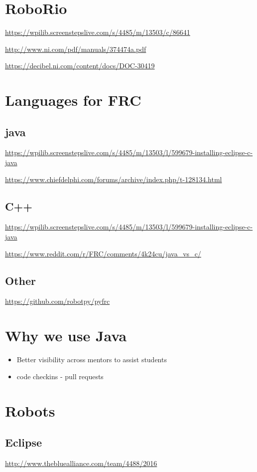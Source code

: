 \documentclass{article}
\begin{document}
\section{RoboRio}
\url{https://wpilib.screenstepslive.com/s/4485/m/13503/c/86641}

\url{http://www.ni.com/pdf/manuals/374474a.pdf}

\url{https://decibel.ni.com/content/docs/DOC-30419}

\section{Languages for FRC}
\subsection{java}
\url{https://wpilib.screenstepslive.com/s/4485/m/13503/l/599679-installing-eclipse-c-java}

\url{https://www.chiefdelphi.com/forums/archive/index.php/t-128134.html}

\subsection{C++}
\url{https://wpilib.screenstepslive.com/s/4485/m/13503/l/599679-installing-eclipse-c-java}

\url{https://www.reddit.com/r/FRC/comments/4k24cu/java_vs_c/}

\subsection{Other}
\url{https://github.com/robotpy/pyfrc}

\section{Why we use Java}
\begin{itemize}
    \item Better visibility across mentors to assist students
    \item code checkins - pull requests
\end{itemize}

\pagebreak
\section{Robots}
\subsection{Eclipse}
\url{http://www.thebluealliance.com/team/4488/2016}
\end{document}
